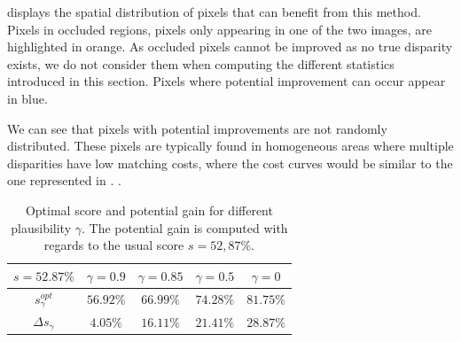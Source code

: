 displays the spatial distribution of pixels that can benefit from this method. Pixels in occluded regions, \ie pixels only appearing in one of the two images, are highlighted in orange. As occluded pixels cannot be improved as no true disparity exists, we do not consider them when computing the different statistics introduced in this section. Pixels where potential improvement can occur appear in blue.

We can see that pixels with potential improvements are not randomly distributed. These pixels are typically found in homogeneous areas where multiple disparities have low matching costs, where the cost curves would be similar to the one represented in .
. 

\begin{table}[ht]
\centering
\begin{tabular}{|c|c|c|c|c|}
\hline
\rowcolor[HTML]{C0C0C0} 
$s=52.87\%$                                & $\gamma=0.9$ & $\gamma=0.85$ & $\gamma=0.5$ & $\gamma=0$ \\ \hline
\cellcolor[HTML]{C0C0C0}$s_\gamma^{opt}$   & $56.92\%$    & $66.99\%$     & $74.28\%$    & $81.75\%$  \\ \hline
\cellcolor[HTML]{C0C0C0}$\Delta s_\gamma$ & $4.05\%$     & $16.11\%$     & $21.41\%$    & $28.87\%$  \\ \hline
\end{tabular}
\caption{Optimal score and potential gain for different plausibility $\gamma$. The potential gain is computed with regards to the usual score $s=52,87\%$.}\label{tab:optimal_score}
\end{table}

